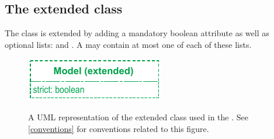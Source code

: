 \newpage
\subsection{The extended  class}
\label{model-class}
\label{listoffluxbounds-class}
\label{listofobjectives-class}
\label{listofgeneproducts-class}

The \SBML \Model class is extended by adding a mandatory boolean attribute 
 as well as optional lists: %
 and .  
A \Model may contain at most one of each of these lists.

\begin{figure}[ht]
  \centering
  \includegraphics[width=6cm]{images/v3harmony_fbc_model.pdf}\\
  \caption{A UML representation of the extended \SBML \Model class used in
  the \FBCPackage. See \ref{conventions} for conventions related to this
  figure.}
  \label{fig:fbc_uml_model}
\end{figure}


%

